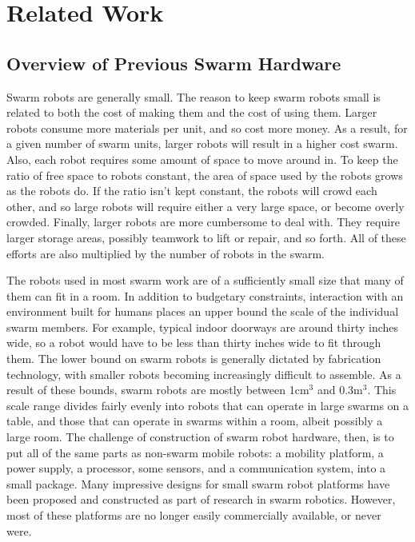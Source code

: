 \documentclass[]{article}
\begin{document}
\section{Related Work}

\subsection{Overview of Previous Swarm Hardware}

Swarm robots are generally small. 
The reason to keep swarm robots small is related to both the cost of making them and the cost of using them. 
Larger robots consume more materials per unit, and so cost more money.
As a result, for a given number of swarm units, larger robots will result in a higher cost swarm. 
Also, each robot requires some amount of space to move around in. 
To keep the ratio of free space to robots constant, the area of space used by the robots grows as the robots do. 
If the ratio isn't kept constant, the robots will crowd each other, and so large robots will require either a very large space, or become overly crowded.
Finally, larger robots are more cumbersome to deal with. 
They require larger storage areas, possibly teamwork to lift or repair, and so forth. 
All of these efforts are also multiplied by the number of robots in the swarm. 

The robots used in most swarm work are of a sufficiently small size that many of them can fit in a room. In addition to budgetary constraints, interaction with an environment built for humans places an upper bound the scale of the individual swarm members. 
For example, typical indoor doorways are around thirty inches wide, so a robot would have to be less than thirty inches wide to fit through them. 
The lower bound on swarm robots is generally dictated by fabrication technology, with smaller robots becoming increasingly difficult to assemble. 
As a result of these bounds, swarm robots are mostly between 1cm$^3$ and 0.3m$^3$. 
This scale range divides fairly evenly into robots that can operate in large swarms on a table, and those that can operate in swarms within a room, albeit possibly a large room. 
The challenge of construction of swarm robot hardware, then, is to put all of the same parts as non-swarm mobile robots: a mobility platform, a power supply, a processor, some sensors, and a communication system, into a small package.
Many impressive designs for small swarm robot platforms have been proposed and constructed as part of research in swarm robotics. 
However, most of these platforms are no longer easily commercially available, or never were. 
\end{document}
